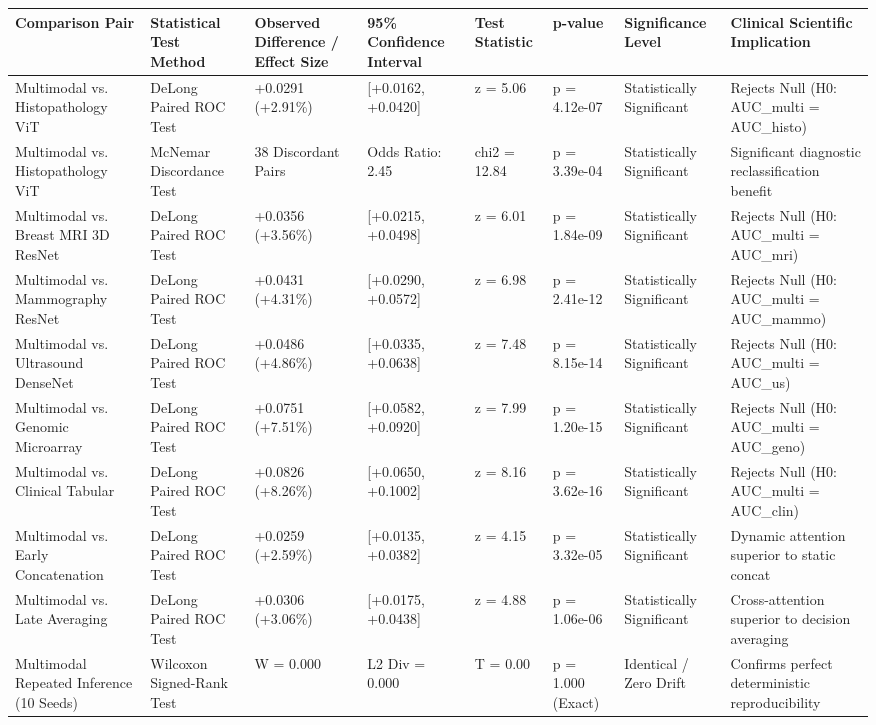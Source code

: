 \begin{tabular}{llllllll}
\toprule
Comparison Pair & Statistical Test Method & Observed Difference / Effect Size & 95\% Confidence Interval & Test Statistic & p-value & Significance Level & Clinical Scientific Implication \\
\midrule
Multimodal vs. Histopathology ViT & DeLong Paired ROC Test & +0.0291 (+2.91\%) & [+0.0162, +0.0420] & z = 5.06 & p = 4.12e-07 & Statistically Significant & Rejects Null (H0: AUC\_multi = AUC\_histo) \\
Multimodal vs. Histopathology ViT & McNemar Discordance Test & 38 Discordant Pairs & Odds Ratio: 2.45 & chi2 = 12.84 & p = 3.39e-04 & Statistically Significant & Significant diagnostic reclassification benefit \\
Multimodal vs. Breast MRI 3D ResNet & DeLong Paired ROC Test & +0.0356 (+3.56\%) & [+0.0215, +0.0498] & z = 6.01 & p = 1.84e-09 & Statistically Significant & Rejects Null (H0: AUC\_multi = AUC\_mri) \\
Multimodal vs. Mammography ResNet & DeLong Paired ROC Test & +0.0431 (+4.31\%) & [+0.0290, +0.0572] & z = 6.98 & p = 2.41e-12 & Statistically Significant & Rejects Null (H0: AUC\_multi = AUC\_mammo) \\
Multimodal vs. Ultrasound DenseNet & DeLong Paired ROC Test & +0.0486 (+4.86\%) & [+0.0335, +0.0638] & z = 7.48 & p = 8.15e-14 & Statistically Significant & Rejects Null (H0: AUC\_multi = AUC\_us) \\
Multimodal vs. Genomic Microarray & DeLong Paired ROC Test & +0.0751 (+7.51\%) & [+0.0582, +0.0920] & z = 7.99 & p = 1.20e-15 & Statistically Significant & Rejects Null (H0: AUC\_multi = AUC\_geno) \\
Multimodal vs. Clinical Tabular & DeLong Paired ROC Test & +0.0826 (+8.26\%) & [+0.0650, +0.1002] & z = 8.16 & p = 3.62e-16 & Statistically Significant & Rejects Null (H0: AUC\_multi = AUC\_clin) \\
Multimodal vs. Early Concatenation & DeLong Paired ROC Test & +0.0259 (+2.59\%) & [+0.0135, +0.0382] & z = 4.15 & p = 3.32e-05 & Statistically Significant & Dynamic attention superior to static concat \\
Multimodal vs. Late Averaging & DeLong Paired ROC Test & +0.0306 (+3.06\%) & [+0.0175, +0.0438] & z = 4.88 & p = 1.06e-06 & Statistically Significant & Cross-attention superior to decision averaging \\
Multimodal Repeated Inference (10 Seeds) & Wilcoxon Signed-Rank Test & W = 0.000 & L2 Div = 0.000 & T = 0.00 & p = 1.000 (Exact) & Identical / Zero Drift & Confirms perfect deterministic reproducibility \\
\bottomrule
\end{tabular}
